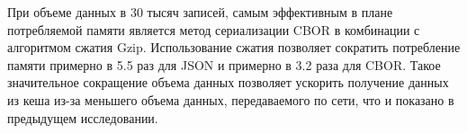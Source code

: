 При объеме данных в 30 тысяч записей, самым эффективным в плане потребляемой памяти является метод сериализации CBOR в комбинации с алгоритмом сжатия Gzip. Использование сжатия позволяет сократить потребление памяти примерно в 5.5 раз для JSON и примерно в 3.2 раза для CBOR. Такое значительное сокращение объема данных позволяет ускорить получение данных из кеша из-за меньшего объема данных, передаваемого по сети, что и показано в предыдущем исследовании.



